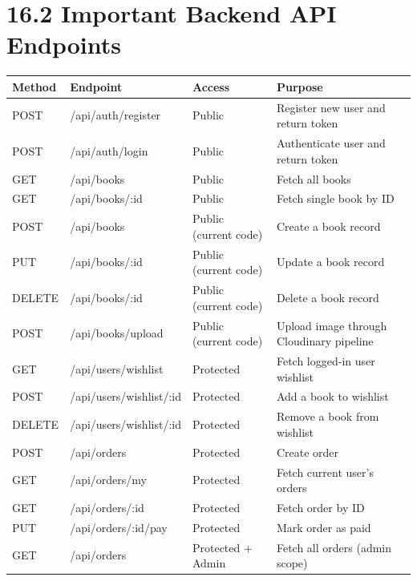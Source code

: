 \documentclass[12pt,a4paper]{report}
\begin{document}
\section*{16.2 Important Backend API Endpoints}
\begin{longtable}{>{\raggedright\arraybackslash}p{} >{\raggedright\arraybackslash}p{} >{\raggedright\arraybackslash}p{} >{\raggedright\arraybackslash}p{}}
\toprule
\textbf{Method} & \textbf{Endpoint} & \textbf{Access} & \textbf{Purpose} \\
\midrule
POST & /api/auth/register & Public & Register new user and return token \\
POST & /api/auth/login & Public & Authenticate user and return token \\
GET & /api/books & Public & Fetch all books \\
GET & /api/books/:id & Public & Fetch single book by ID \\
POST & /api/books & Public (current code) & Create a book record \\
PUT & /api/books/:id & Public (current code) & Update a book record \\
DELETE & /api/books/:id & Public (current code) & Delete a book record \\
POST & /api/books/upload & Public (current code) & Upload image through Cloudinary pipeline \\
GET & /api/users/wishlist & Protected & Fetch logged-in user wishlist \\
POST & /api/users/wishlist/:id & Protected & Add a book to wishlist \\
DELETE & /api/users/wishlist/:id & Protected & Remove a book from wishlist \\
POST & /api/orders & Protected & Create order \\
GET & /api/orders/my & Protected & Fetch current user's orders \\
GET & /api/orders/:id & Protected & Fetch order by ID \\
PUT & /api/orders/:id/pay & Protected & Mark order as paid \\
GET & /api/orders & Protected + Admin & Fetch all orders (admin scope) \\
\bottomrule
\end{longtable}
\end{document}
